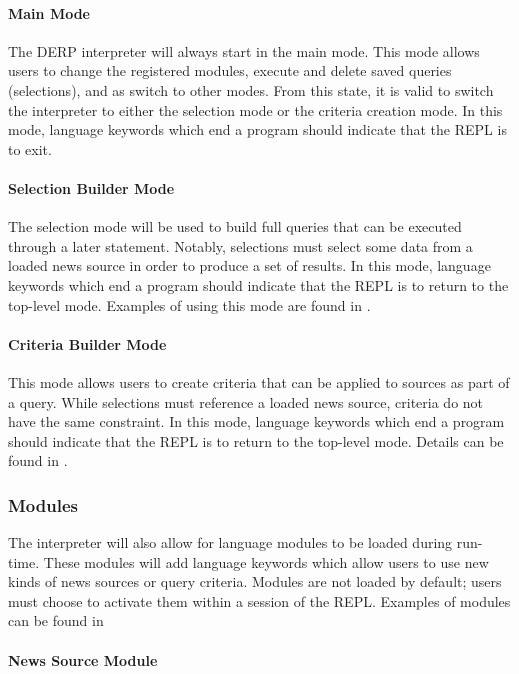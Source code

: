 \paragraph{Main Mode}

The DERP interpreter will always start in the main mode. This mode allows users to change the registered modules, execute and delete saved queries (selections), and as switch to other modes. From this state, it is valid to switch the interpreter to either the selection mode or the criteria creation mode. In this mode, language keywords which end a program should indicate that the REPL is to exit.

\paragraph{Selection Builder Mode}

The selection mode will be used to build full queries that can be executed through a later statement. Notably, selections must select some data from a loaded news source in order to produce a set of results. In this mode, language keywords which end a program should indicate that the REPL is to return to the top-level mode. Examples of using this mode are found in . 

\paragraph{Criteria Builder Mode}

This mode allows users to create criteria that can be applied to sources as part of a query. While selections must reference a loaded news source, criteria do not have the same constraint. In this mode, language keywords which end a program should indicate that the REPL is to return to the top-level mode. Details can be found in .


\subsubsection{Modules}

The interpreter will also allow for language modules to be loaded during run-time. These modules will add language keywords which allow users to use new kinds of news sources or query criteria. Modules are not loaded by default; users must choose to activate them within a session of the REPL. Examples of modules can be found in 

\paragraph{News Source Module }

